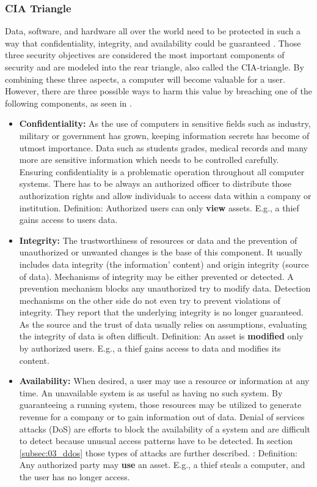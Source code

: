 \subsubsection{CIA Triangle}
Data, software, and hardware all over the world need to be protected in such a way that confidentiality, integrity, and availability could be guaranteed \cite{Pfleeger2014}. Those three security objectives are considered the most important components of security and are modeled into the rear triangle, also called the CIA-triangle. By combining these three aspects, a computer will become valuable for a user. However, there are three possible ways to harm this value by breaching one of the following components, as seen in \cite{Bishop2004}.
\begin{itemize}
  \item \textbf{Confidentiality:} As the use of computers in sensitive fields such as industry, military or government has grown, keeping information secrets has become of utmost importance. Data such as students grades, medical records and many more are sensitive information which needs to be controlled carefully. Ensuring confidentiality is a problematic operation throughout all computer systems. There has to be always an authorized officer to distribute those authorization rights and allow individuals to access data within a company or institution.
        \subitem Definition: Authorized users can only \textbf{view} assets. E.g., a thief gains access to users data.
  \item \textbf{Integrity:} The trustworthiness of resources or data and the prevention of unauthorized or unwanted changes is the base of this component. It usually includes data integrity (the information' content) and origin integrity (source of data). Mechanisms of integrity may be either prevented or detected. A prevention mechanism blocks any unauthorized try to modify data. Detection mechanisms on the other side do not even try to prevent violations of integrity. They report that the underlying integrity is no longer guaranteed. As the source and the trust of data usually relies on assumptions, evaluating the integrity of data is often difficult.
        \subitem Definition: An asset is \textbf{modified} only by authorized users. E.g., a thief gains access to data and modifies its content.
  \item \textbf{Availability:} When desired, a user may use a resource or information at any time. An unavailable system is as useful as having no such system. By guaranteeing a running system, those resources may be utilized to generate revenue for a company or to gain information out of data. Denial of services attacks (DoS) are efforts to block the availability of a system and are difficult to detect because unusual access patterns have to be detected. In section \ref{subsec:03_ddos} those types of attacks are further described.
        \subitem:  Definition: Any authorized party may \textbf{use} an asset. E.g., a thief steals a computer, and the user has no longer access.
\end{itemize}


